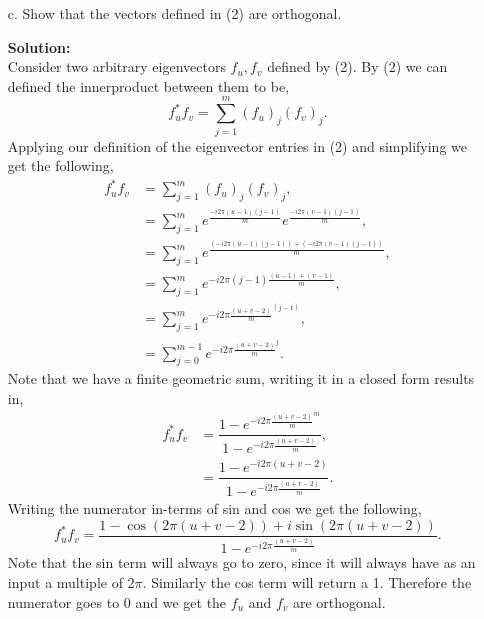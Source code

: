 \documentclass[12pt]{article}
\makeatletter
\theoremstyle{homework}
\newenvironment{exercise}[1]
{\def\@currentlabel{#1}\exercisecore}
{\endexercisecore}
\newcommand{\localhead}[1]{\par\smallskip\noindent\textbf{#1}\nobreak\\}%
\newcommand\solution{\localhead{Solution:}}
\makeatother
\begin{document}
\begin{exercise}{P23}
\begin{enumerate}
    \item[c.] Show that the vectors defined in (2) are orthogonal. \\
    \solution Consider two arbitrary eigenvectors $f_u,f_v$ defined by (2). By (2) we can defined the innerproduct between them to be, 
    \begin{equation*}
      f_u^*f_v = \sum_{j = 1}^m (f_u)_j(f_v)_j.
    \end{equation*}
    Applying our definition of the eigenvector entries in (2) and simplifying we get the following, 
    \begin{align*}
      f_u^*f_v &=\sum_{j = 1}^m (f_u)_j(f_v)_j,\\
      &=\sum_{j = 1}^m e^{\frac{-i 2 \pi (u - 1)(j - 1)}{m}}e^{\frac{-i 2 \pi (v - 1)(j - 1)}{m}},\\
      &=\sum_{j = 1}^m e^{\frac{(-i 2 \pi (u - 1) (j - 1)) +(-i 2 \pi (v - 1) (j - 1))}{m}},\\
      &=\sum_{j = 1}^m e^{-i 2 \pi (j-1) \frac{(u - 1) + (v - 1)}{m} },\\
      &=\sum_{j = 1}^m e^{-i 2 \pi \frac{(u + v - 2)}{m}^{(j-1)}},\\
      &=\sum_{j = 0}^{m-1} e^{-i 2 \pi \frac{(u + v - 2)}{m}^{j}}.
    \end{align*}
    Note that we have a finite geometric sum, writing it in a closed form results in, 
    \begin{align*}
      f_u^*f_v &= \dfrac{1 - e^{-i 2 \pi \frac{(u + v - 2)}{m}^{m}}}{1 - e^{-i 2 \pi \frac{(u + v - 2)}{m}}},\\
       &= \dfrac{1 - e^{-i 2 \pi (u + v - 2)}}{1 - e^{-i 2 \pi \frac{(u + v - 2)}{m}}}.
    \end{align*}
    Writing the numerator in-terms of sin and cos we get the following, 
    \begin{equation*}
      f_u^*f_v = \dfrac{1 - \cos(2\pi(u+v - 2)) + i\sin(2\pi(u+v - 2))}{1 - e^{-i 2 \pi \frac{(u + v - 2)}{m}}}.
    \end{equation*}
    Note that the sin term will always go to zero, since it will always have as an input a multiple of $2\pi$. Similarly the cos
    term will return a 1. Therefore the numerator goes to 0 and we get the $f_u$ and $f_v$ are orthogonal. 

    \vspace{1in}



\end{enumerate}
\end{exercise}
\end{document}
